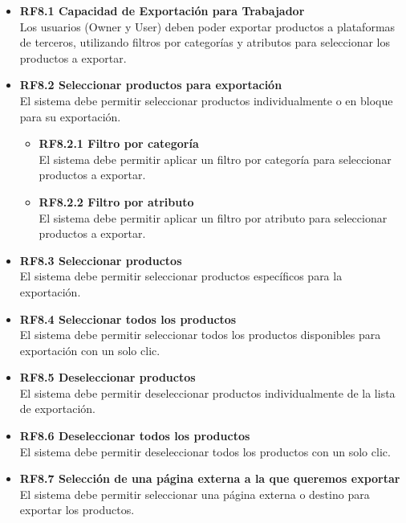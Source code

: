 \documentclass[12pt.a4paper]{article}
\begin{document}
\begin{itemize}
    \item \textbf{RF8.1 Capacidad de Exportación para Trabajador} \\
    Los usuarios (Owner y User) deben poder exportar productos a plataformas de terceros, utilizando filtros por categorías y atributos para seleccionar los productos a exportar.

    \item \textbf{RF8.2 Seleccionar productos para exportación} \\
    El sistema debe permitir seleccionar productos individualmente o en bloque para su exportación.
    \begin{itemize}
        \item \textbf{RF8.2.1 Filtro por categoría} \\
        El sistema debe permitir aplicar un filtro por categoría para seleccionar productos a exportar.

        \item \textbf{RF8.2.2 Filtro por atributo} \\
        El sistema debe permitir aplicar un filtro por atributo para seleccionar productos a exportar.
    \end{itemize}

    \item \textbf{RF8.3 Seleccionar productos} \\
    El sistema debe permitir seleccionar productos específicos para la exportación.

    \item \textbf{RF8.4 Seleccionar todos los productos} \\
    El sistema debe permitir seleccionar todos los productos disponibles para exportación con un solo clic.

    \item \textbf{RF8.5 Deseleccionar productos} \\
    El sistema debe permitir deseleccionar productos individualmente de la lista de exportación.

    \item \textbf{RF8.6 Deseleccionar todos los productos} \\
    El sistema debe permitir deseleccionar todos los productos con un solo clic.

    \item \textbf{RF8.7 Selección de una página externa a la que queremos exportar} \\
    El sistema debe permitir seleccionar una página externa o destino para exportar los productos.


\end{itemize}
\end{document}
